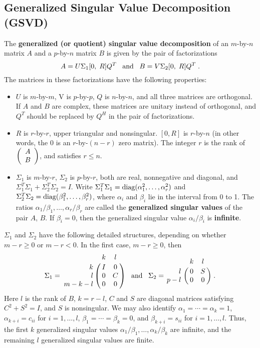 \nopagebreak

\subsection{Generalized Singular Value Decomposition (GSVD)}\label{sectionGSVDdriver}

The {\bf generalized (or quotient) singular value decomposition}
of an $m$-by-$n$ matrix $A$ and a
$p$-by-$n$ matrix $B$ is given by the pair of factorizations
\[
A = U \Sigma_1 [0,\; R ] Q^T
\;\;\; {\rm and} \;\;\;
B = V \Sigma_2 [0, \; R ] Q^T \;.
\]
The matrices in these factorizations have the following properties:
\begin{itemize}
\item $U$ is $m$-by-$m$, V is $p$-by-$p$, $Q$ is $n$-by-$n$, and
all three matrices are orthogonal. If $A$ and
$B$ are complex, these matrices are unitary instead of
orthogonal, and $Q^T$ should be
replaced by $Q^H$ in the pair of factorizations.
\item $R$ is $r$-by-$r$, upper triangular and nonsingular.
$[0,R]$ is $r$-by-$n$ (in other words, the $0$ is an $r$-by-$(n-r)$
zero matrix).
The integer $r$ is the rank of
$\bmat{c} A \\ B \emat$, and satisfies $r \leq n$.
\item $\Sigma_1$ is $m$-by-$r$,
$\Sigma_2$ is $p$-by-$r$, both are real, nonnegative  and diagonal, and
$\Sigma_1^T \Sigma_1 + \Sigma_2^T \Sigma_2 = I$.
Write
$\Sigma_1^T \Sigma_1 = {\rm diag} ( \alpha_1^2 , \ldots , \alpha_r^2 )$ and
$\Sigma_2^T \Sigma_2 = {\rm diag} ( \beta_1^2 , \ldots , \beta_r^2 )$,
where $\alpha_i$ and $\beta_i$ lie in the interval from 0 to 1.
The ratios
$\alpha_1 / \beta_1 , \ldots ,  \alpha_r / \beta_r$
are called the {\bf generalized singular values} of the pair $A$, $B$.
If $\beta_i = 0$, then the generalized singular value
$\alpha_i / \beta_i$ is {\bf infinite}.
\end{itemize}

$\Sigma_1$ and $\Sigma_2$ have the following detailed
structures, depending on whether $m-r \geq 0$ or
$m-r < 0$. In the first case, $m-r \geq 0$, then
\[
\Sigma_1 = \bordermatrix{ & k & l \cr
                 \hfill k & I & 0 \cr
                 \hfill l & 0 & C \cr
                    m-k-l & 0 & 0 }
                 \; \; \; {\rm and} \; \; \;
\Sigma_2 = \bordermatrix{ & k & l \cr
                 \hfill l & 0 & S \cr
                      p-l & 0 & 0 } \; .
\]
Here $l$ is the rank of $B$, $k=r-l$, $C$ and $S$ are diagonal
matrices satisfying $C^2  + S^2 = I$, and $S$ is nonsingular.
We may also identify
$\alpha_1 = \cdots = \alpha_k = 1$,
$\alpha_{k+i} = c_{ii}$ for $i=1, \ldots , l$,
$\beta_1 = \cdots = \beta_k = 0$, and
$\beta_{k+i} = s_{ii}$ for $i=1, \ldots , l$.
Thus, the first $k$ generalized singular values
$\alpha_1 / \beta_1 , \ldots , \alpha_k / \beta_k$
are infinite, and the remaining $l$ generalized singular values
are finite.

